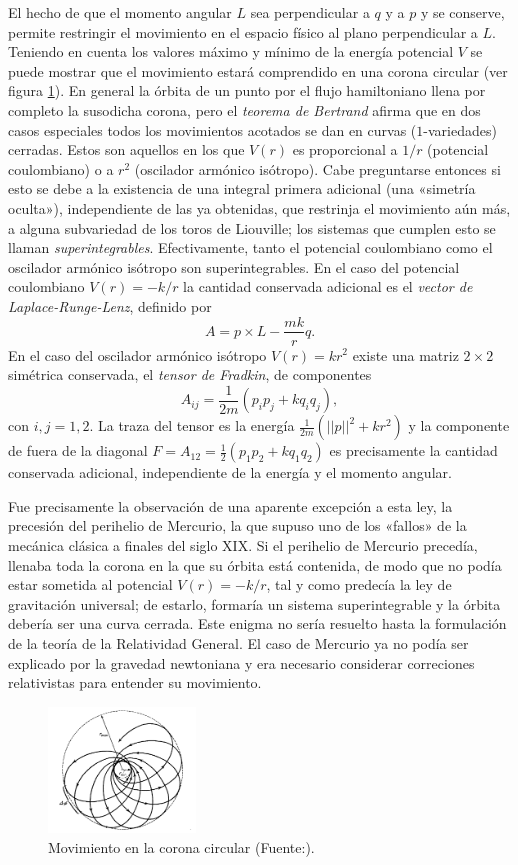 El hecho de que el momento angular $L$ sea perpendicular a $q$ y a $p$ y se conserve, permite restringir el movimiento en el espacio físico al plano perpendicular a $L$. Teniendo en cuenta los valores máximo y mínimo de la energía potencial $V$ se puede mostrar que el movimiento estará comprendido en una corona circular (ver figura \ref{fig:bertrand}). En general la órbita de un punto por el flujo hamiltoniano llena por completo la susodicha corona, pero el \emph{teorema de Bertrand} afirma que en dos casos especiales todos los movimientos acotados se dan en curvas ($1$-variedades) cerradas. Estos son aquellos en los que $V(r)$ es proporcional a $1/r$ (potencial coulombiano) o a $r^2$ (oscilador armónico isótropo). Cabe preguntarse entonces si esto se debe a la existencia de una integral primera adicional (una «simetría oculta»), independiente de las ya obtenidas, que restrinja el movimiento aún más, a alguna subvariedad de los toros de Liouville; los sistemas que cumplen esto se llaman \emph{superintegrables}. Efectivamente, tanto el potencial coulombiano como el oscilador armónico isótropo son superintegrables. En el caso del potencial coulombiano $V(r)=-k/r$ la cantidad conservada adicional es el \emph{vector de Laplace-Runge-Lenz}, definido por
\begin{equation*}
  A=p\times L - \frac{mk}{r}q.
\end{equation*}
En el caso del oscilador armónico isótropo $V(r)=kr^2$ existe una matriz $2\times 2$ simétrica conservada, el \emph{tensor de Fradkin}, de componentes
\begin{equation*}
  A_{ij}=\frac{1}{2m}(p_ip_j+kq_iq_j),
\end{equation*}
con $i,j=1,2$. La traza del tensor es la energía $\tfrac{1}{2m}(||p||^2+kr^2)$ y la componente de fuera de la diagonal $F=A_{12}=\frac{1}{2}(p_1p_2+kq_1q_2)$ es precisamente la cantidad conservada adicional, independiente de la energía y el momento angular.

Fue precisamente la observación de una aparente excepción a esta ley, la precesión del perihelio de Mercurio, la que supuso uno de los «fallos» de la mecánica clásica a finales del siglo XIX. Si el perihelio de Mercurio precedía, llenaba toda la corona en la que su órbita está contenida, de modo que no podía estar sometida al potencial $V(r)=-k/r$, tal y como predecía la ley de gravitación universal; de estarlo, formaría un sistema superintegrable y la órbita debería ser una curva cerrada. Este enigma no sería resuelto hasta la formulación de la teoría de la Relatividad General. El caso de Mercurio ya no podía ser explicado por la gravedad newtoniana y era necesario considerar correciones relativistas para entender su movimiento.

\begin{figure}[h]
  \centering
  \includegraphics[width=0.35\textwidth]{pics/bertrand}
  \caption{\small Movimiento en la corona circular (Fuente:\cite{landau}).}
  \label{fig:bertrand}
\end{figure}

